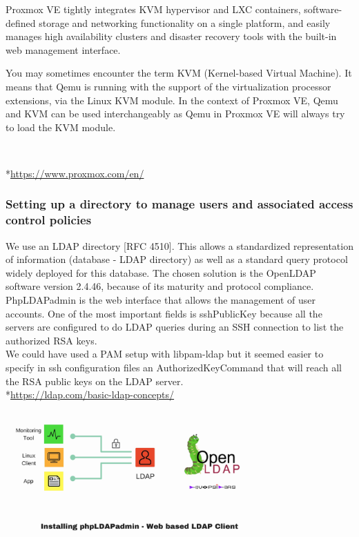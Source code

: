 \vspace{1cm}
Proxmox VE tightly integrates KVM hypervisor and LXC
containers, software-defined storage and networking functionality on a
single platform, and easily manages high availability clusters and
disaster recovery tools with the built-in web management interface.

\vspace{0.5cm}
You may sometimes encounter the term KVM (Kernel-based Virtual Machine).
It means that Qemu is running with the support of the virtualization
processor extensions, via the Linux KVM module. In the context of
Proxmox VE, Qemu and KVM can be used interchangeably as Qemu in Proxmox
VE will always try to load the KVM module.

\\
\vspace{1cm}

*\url{https://www.proxmox.com/en/}

\pagebreak

\subsubsection{Setting up a directory to manage users and associated access control policies}

\vspace{0.4cm}

We use an LDAP directory [RFC 4510].
This allows a standardized representation of information (database - LDAP directory) as well as a standard query protocol widely deployed for this database.
The chosen solution is the OpenLDAP software version 2.4.46, because of its
maturity and protocol compliance. PhpLDAPadmin is the web interface that
allows the management of user accounts. One of the most important fields is
sshPublicKey because all the servers are configured to do LDAP queries
during an SSH connection to list the authorized RSA keys.
\\ We could have used a PAM setup with libpam-ldap but it seemed easier to specify
in ssh configuration files an AuthorizedKeyCommand that will reach all the
RSA public keys on the LDAP server.
\\
*\url{https://ldap.com/basic-ldap-concepts/}

\begin{center}

\includegraphics[width=0.75\textwidth]{images/ldap-example.jpg}

\end{center}

